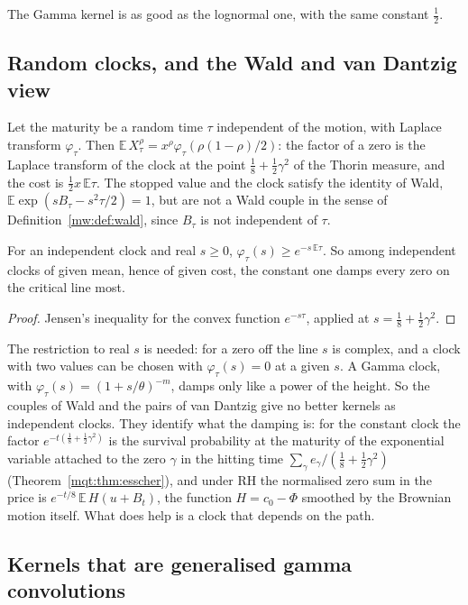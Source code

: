 The Gamma kernel is as good as the lognormal one, with the same constant $\frac12$.

\subsection{Random clocks, and the Wald and van Dantzig view}

Let the maturity be a random time $\tau$ independent of the motion, with Laplace transform $\varphi_\tau$. Then $\mathbb E\,X_\tau^\rho=x^\rho\varphi_\tau(\rho(1-\rho)/2)$: the factor of a zero is the Laplace transform of the clock at the point $\frac18+\frac12\gamma^2$ of the Thorin measure, and the cost is $\frac12x\,\mathbb E\tau$. The stopped value and the clock satisfy the identity of Wald, $\mathbb E\exp(sB_\tau-s^2\tau/2)=1$, but are not a Wald couple in the sense of Definition~\ref{mw:def:wald}, since $B_\tau$ is not independent of $\tau$.

\begin{proposition}\label{gbm:prop:clock}
For an independent clock and real $s\ge0$, $\varphi_\tau(s)\ge e^{-s\,\mathbb E\tau}$. So among independent clocks of given mean, hence of given cost, the constant one damps every zero on the critical line most.
\end{proposition}

\begin{proof}
Jensen's inequality for the convex function $e^{-s\tau}$, applied at $s=\frac18+\frac12\gamma^2$.
\end{proof}

The restriction to real $s$ is needed: for a zero off the line $s$ is complex, and a clock with two values can be chosen with $\varphi_\tau(s)=0$ at a given $s$. A Gamma clock, with $\varphi_\tau(s)=(1+s/\theta)^{-m}$, damps only like a power of the height. So the couples of Wald and the pairs of van Dantzig give no better kernels as independent clocks. They identify what the damping is: for the constant clock the factor $e^{-t(\frac18+\frac12\gamma^2)}$ is the survival probability at the maturity of the exponential variable attached to the zero $\gamma$ in the hitting time $\sum_\gamma e_\gamma/(\frac18+\frac12\gamma^2)$ (Theorem~\ref{mqt:thm:esscher}), and under RH the normalised zero sum in the price is $e^{-t/8}\,\mathbb E\,H(u+B_t)$, the function $H=c_0-\Phi$ smoothed by the Brownian motion itself. What does help is a clock that depends on the path.

\subsection{Kernels that are generalised gamma convolutions}

